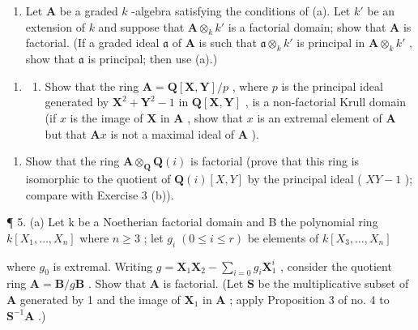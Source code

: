 \begin{enumerate}
\def\labelenumi{(\alph{enumi})}
\setcounter{enumi}{1}
\tightlist
\item
  Let \(\mathbf{A}\) be a graded \(k\) -algebra satisfying the conditions of (a). Let \(k'\) be an extension of \(k\) and suppose that \(\mathbf{A} \otimes_k k'\) is a factorial domain; show that \(\mathbf{A}\) is factorial. (If a graded ideal \(\mathfrak{a}\) of \(\mathbf{A}\) is such that \(\mathfrak{a} \otimes_k k'\) is principal in \(\mathbf{A} \otimes_k k'\) , show that \(\mathfrak{a}\) is principal; then use (a).)
\end{enumerate}

\begin{enumerate}
\def\labelenumi{\arabic{enumi}.}
\setcounter{enumi}{3}
\tightlist
\item
  \begin{enumerate}
  \def\labelenumii{(\alph{enumii})}
  \tightlist
  \item
    Show that the ring \(\mathbf{A} = \mathbf{Q}[\mathbf{X},\mathbf{Y}] / p\) , where \(p\) is the principal ideal generated by \(\mathbf{X}^2 +\mathbf{Y}^2 -1\) in \(\mathbf{Q}[\mathbf{X},\mathbf{Y}]\) , is a non-factorial Krull domain (if \(x\) is the image of \(\mathbf{X}\) in \(\mathbf{A}\) , show that \(x\) is an extremal element of \(\mathbf{A}\) but that \(\mathbf{A}x\) is not a maximal ideal of \(\mathbf{A}\) ).
  \end{enumerate}
\end{enumerate}

\begin{enumerate}
\def\labelenumi{(\alph{enumi})}
\setcounter{enumi}{1}
\tightlist
\item
  Show that the ring \(\mathbf{A} \otimes_{\mathbf{Q}} \mathbf{Q}(i)\) is factorial (prove that this ring is isomorphic to the quotient of \(\mathbf{Q}(i) [X, Y]\) by the principal ideal ( \(XY - 1\) ); compare with Exercise 3 (b)).
\end{enumerate}

¶ 5. (a) Let k be a Noetherian factorial domain and B the polynomial ring \(k[X_{1},\ldots,X_{n}]\) where \(n\geqslant3\) ; let \(g_{i}\;(0\leqslant i\leqslant r)\) be elements of \(k[X_{3},\ldots,X_{n}]\)

where \(g_0\) is extremal. Writing \(g = \mathbf{X}_1\mathbf{X}_2 - \sum_{i=0} g_i\mathbf{X}_1^i\) , consider the quotient ring \(\mathbf{A} = \mathbf{B}/g\mathbf{B}\) . Show that \(\mathbf{A}\) is factorial. (Let \(\mathbf{S}\) be the multiplicative subset of \(\mathbf{A}\) generated by 1 and the image of \(\mathbf{X}_1\) in \(\mathbf{A}\) ; apply Proposition 3 of no. 4 to \(\mathbf{S}^{-1}\mathbf{A}\) .)

